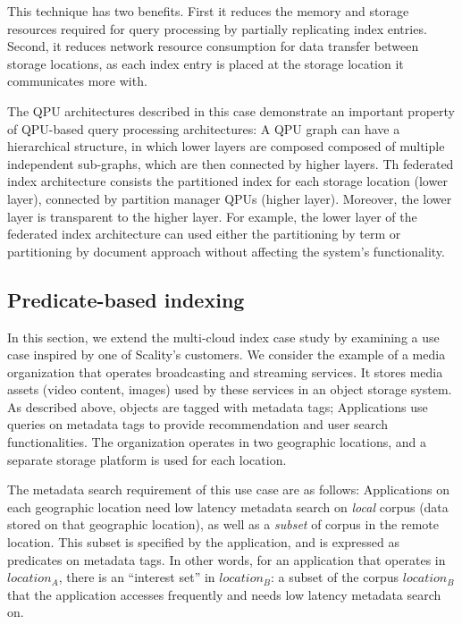 This technique has two benefits.
First it reduces the memory and storage resources required for query processing by partially replicating index entries.
Second, it reduces network resource consumption for data transfer between storage locations,
as each index entry is placed at the storage location it communicates more with.

The QPU architectures described in this case demonstrate an important property of QPU-based query processing architectures:
A QPU graph can have a hierarchical structure,
in which lower layers are composed composed of multiple independent sub-graphs,
which are then connected by higher layers.
Th federated index architecture consists the partitioned index for each storage location (lower layer),
connected by partition manager QPUs (higher layer).
Moreover, the lower layer is transparent to the higher layer.
For example, the lower layer of the federated index architecture can used either the partitioning by term or
partitioning by document approach without affecting the system's functionality.

\subsection{Predicate-based indexing}

In this section, we extend the multi-cloud index case study by examining a use case inspired by one of Scality's customers.
We consider the example of a media organization that operates broadcasting and streaming services.
It stores media assets (video content, images) used by these services in an object storage system.
As described above, objects are tagged with metadata tags;
Applications use queries on metadata tags to provide recommendation and user search functionalities.
The organization operates in two geographic locations, and a separate storage platform is used for each location.

The metadata search requirement of this use case are as follows:
Applications on each geographic location need low latency metadata search on \textit{local} corpus (data stored on that geographic location),
as well as a \textit{subset} of corpus in the remote location.
This subset is specified by the application, and is expressed as predicates on metadata tags.
In other words, for an application that operates in $location_A$, there is an ``interest set'' in $location_B$:
a subset of the corpus $location_B$ that the application accesses frequently and needs low latency metadata search on.

